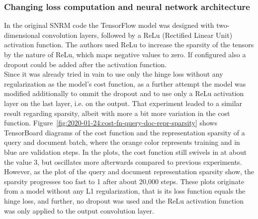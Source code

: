 \subsubsection*{Changing loss computation and neural network architecture}
In the original SNRM code the TensorFlow model was designed with two-dimensional convolution layers, 
    followed by a ReLu (Rectified Linear Unit) activation function.
The authors used ReLu to increase the sparsity of the tensors by the nature of ReLu,
    which maps negative values to zero.
If configured also a dropout could be added after the activation function.\\
Since it was already tried in vain to use only the hinge loss without any regularization as the 
    model's cost function, as a further attempt the model was modified additionally 
    to ommit the dropout and to use only a ReLu activation layer on the last layer, i.e. on the output.
That experiment leaded to a similar result regarding sparsity, albeit with more a bit more variation 
    in the cost function.
Figure~\ref{fig:2020-01-24:cost-fn-query-doc-repr-sparsity} shows TensorBoard diagrams of 
    the cost function and the representation sparsity of a query and document batch, where 
    the orange color represents training and in blue are validation steps.
In the plots, the cost function still swivels in at about the value 3, but oscillates more afterwards
    compared to previous experiments.
However, as the plot of the query and document representation sparsity show, the sparsity 
    progresses too fast to 1 after about 20,000 steps.
These plots originate from a model without any L1 regularization, that is its loss function equals 
    the hinge loss, and further, no dropout was used and the ReLu activation function was only applied 
    to the output convolution layer.

